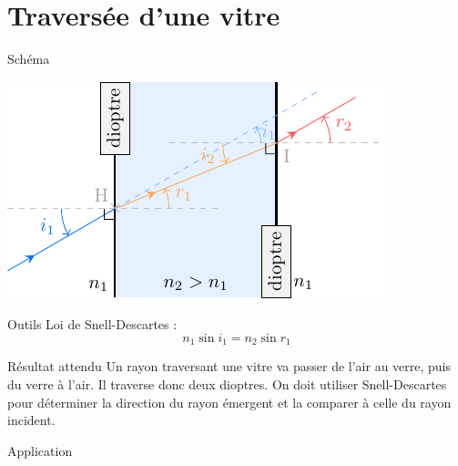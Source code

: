 \documentclass[../main/main.tex]{subfiles}
\begin{document}

\section{Traversée d'une vitre}
\begin{tcbraster}[raster columns=11, raster equal height=rows]
    \begin{tcolorbox}[blankest, raster multicolumn=5, space to=\myspace]
        \begin{tcbraster}[raster columns=1]
            \begin{NCdefi}[raster multicolumn=1]{Schéma}
                \begin{center}
                    \includegraphics{../figures/ch2-7}
                \end{center}
            \end{NCdefi}
            \begin{NCdemo}[add to natural height=\myspace]{Outils}
                Loi de Snell-Descartes :
                \[n_1\sin i_1 = n_2\sin r_1\]
            \end{NCdemo}
        \end{tcbraster}
    \end{tcolorbox}
    \begin{tcolorbox}[blankest, raster multicolumn=6, space to=\myspace]
        \begin{tcbraster}[raster columns=1]
            \begin{NCprop}[raster multicolumn=6]{Résultat attendu}
                Un rayon traversant une vitre va passer de l'air au verre, puis du verre
                à l'air. Il traverse donc deux dioptres. On doit utiliser
                Snell-Descartes pour déterminer la direction du rayon émergent et la
                comparer à celle du rayon incident.
            \end{NCprop}
            \begin{NCexem}[sidebyside, righthand width=1.5cm,
                add to natural height=\myspace]{Application}

\end{NCexem}
\end{tcbraster}
\end{tcolorbox}
\end{tcbraster}
\end{document}

